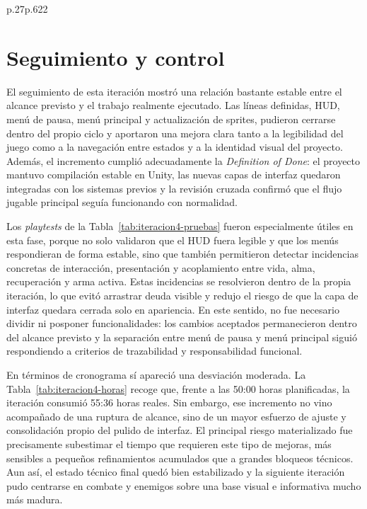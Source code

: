 \begin{table}[!htbp]
\begin{coolTable}{p{.27\textwidth}p{.62\textwidth}}{2}
    \end{coolTable}
    \caption{Pruebas de playtest realizadas en la iteración 4.}
    \label{tab:iteracion4-pruebas}
\end{table}

\section{Seguimiento y control}
El seguimiento de esta iteración mostró una relación bastante estable entre el alcance
previsto y el trabajo realmente ejecutado. Las líneas definidas, HUD, menú de pausa, menú
principal y actualización de sprites, pudieron cerrarse dentro del propio ciclo y aportaron
una mejora clara tanto a la legibilidad del juego como a la navegación entre estados y a la
identidad visual del proyecto. Además, el incremento cumplió adecuadamente la
\textit{Definition of Done}: el proyecto mantuvo compilación estable en Unity, las nuevas
capas de interfaz quedaron integradas con los sistemas previos y la revisión cruzada confirmó
que el flujo jugable principal seguía funcionando con normalidad.

Los \textit{playtests} de la Tabla~\ref{tab:iteracion4-pruebas} fueron especialmente útiles
en esta fase, porque no solo validaron que el HUD fuera legible y que los menús respondieran
de forma estable, sino que también permitieron detectar incidencias concretas de interacción,
presentación y acoplamiento entre vida, alma, recuperación y arma activa. Estas incidencias
se resolvieron dentro de la propia iteración, lo que evitó arrastrar deuda visible y redujo
el riesgo de que la capa de interfaz quedara cerrada solo en apariencia. En este sentido, no
fue necesario dividir ni posponer funcionalidades: los cambios aceptados permanecieron dentro
del alcance previsto y la separación entre menú de pausa y menú principal siguió respondiendo
a criterios de trazabilidad y responsabilidad funcional.

En términos de cronograma sí apareció una desviación moderada. La Tabla~\ref{tab:iteracion4-horas}
recoge que, frente a las 50:00 horas planificadas, la iteración consumió 55:36 horas reales.
Sin embargo, ese incremento no vino acompañado de una ruptura de alcance, sino de un mayor
esfuerzo de ajuste y consolidación propio del pulido de interfaz. El principal riesgo
materializado fue precisamente subestimar el tiempo que requieren este tipo de mejoras, más
sensibles a pequeños refinamientos acumulados que a grandes bloqueos técnicos. Aun así, el
estado técnico final quedó bien estabilizado y la siguiente iteración pudo centrarse en
combate y enemigos sobre una base visual e informativa mucho más madura.


